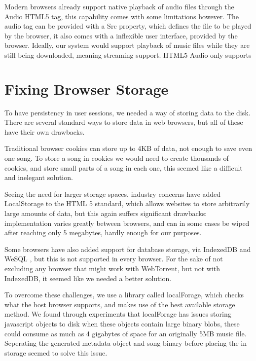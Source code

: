 

Modern browsers already support native playback of audio files through the Audio \acs{HTML}5 tag, 
this capability comes with some limitations however.
The audio tag can be provided with a Src property, which defines the file to be played by the browser,
it also comes with a inflexible user interface, provided by the browser.
Ideally, our system would support playback of music files while they are still being downloaded, 
meaning streaming support. 
\acs{HTML}5 Audio only supports 
\newline


\section{Fixing Browser Storage}
To have persistency in user sessions, we needed a way of storing data to the disk. There are several standard ways to store data in web browsers, but all of these have their own drawbacks.

Traditional browser cookies can store up to 4KB of data, 
not enough to save even one song. 
To store a song in cookies we would need to create thousands of cookies, 
and store small parts of a song in each one, 
this seemed like a difficult and inelegant solution.

Seeing the need for larger storage spaces, 
industry concerns have added LocalStorage to the \acs{HTML} 5 standard,
which allows websites to store arbitrarily large amounts of data,
but this again suffers significant drawbacks: 
implementation varies greatly between browsers, 
and can in some cases be wiped after reaching only 5 megabytes, 
hardly enough for our purposes.

Some browsers have also added support for database storage, via IndexedDB and WeSQL \citep{WebSQL}, 
but this is not supported in every browser. 
For the sake of not excluding any browser that might work with WebTorrent, but not with IndexedDB,
it seemed like we needed a better solution.
\newline

To overcome these challenges, we use a library called localForage, 
which checks what the host browser supports,
and makes use of the best available storage method.
We found through experiments
that localForage has issues storing javascript objects to disk when these objects contain large binary blobs, 
these could consume as much as 4 gigabytes of space for an originally 5MB music file.
Seperating the generated metadata object and song binary before placing the in storage
seemed to solve this issue.
\newline

